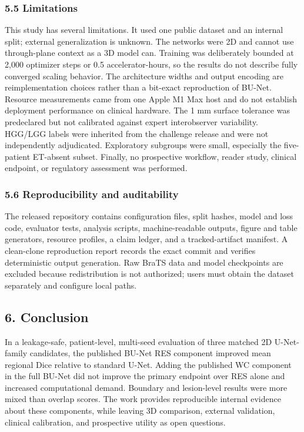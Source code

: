 \documentclass[
  10pt,
  letterpaper,
]{article}
\begin{document}
\subsubsection{5.5 Limitations}\label{limitations}

This study has several limitations. It used one public dataset and an
internal split; external generalization is unknown. The networks were 2D
and cannot use through-plane context as a 3D model can. Training was
deliberately bounded at 2,000 optimizer steps or 0.5 accelerator-hours,
so the results do not describe fully converged scaling behavior. The
architecture widths and output encoding are reimplementation choices
rather than a bit-exact reproduction of BU-Net. Resource measurements
came from one Apple M1 Max host and do not establish deployment
performance on clinical hardware. The 1 mm surface tolerance was
predeclared but not calibrated against expert interobserver variability.
HGG/LGG labels were inherited from the challenge release and were not
independently adjudicated. Exploratory subgroups were small, especially
the five-patient ET-absent subset. Finally, no prospective workflow,
reader study, clinical endpoint, or regulatory assessment was performed.

\subsubsection{5.6 Reproducibility and
auditability}\label{reproducibility-and-auditability}

The released repository contains configuration files, split hashes,
model and loss code, evaluator tests, analysis scripts, machine-readable
outputs, figure and table generators, resource profiles, a claim ledger,
and a tracked-artifact manifest. A clean-clone reproduction report
records the exact commit and verifies deterministic output generation.
Raw BraTS data and model checkpoints are excluded because redistribution
is not authorized; users must obtain the dataset separately and
configure local paths.

\subsection{6. Conclusion}\label{conclusion}

In a leakage-safe, patient-level, multi-seed evaluation of three matched
2D U-Net-family candidates, the published BU-Net RES component improved
mean regional Dice relative to standard U-Net. Adding the published WC
component in the full BU-Net did not improve the primary endpoint over
RES alone and increased computational demand. Boundary and lesion-level
results were more mixed than overlap scores. The work provides
reproducible internal evidence about these components, while leaving 3D
comparison, external validation, clinical calibration, and prospective
utility as open questions.
\end{document}
